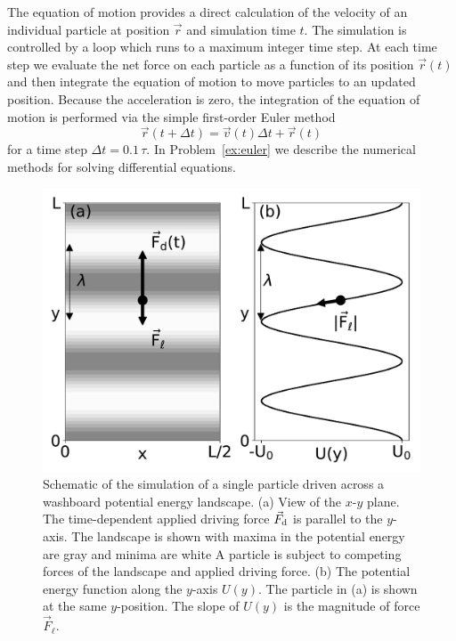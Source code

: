 \documentclass[preprint,showpacs,preprintnumbers,amsmath,amssymb,aps,prb]{revtex4-1}
\theoremstyle{remark}
\begin{document}
The equation of motion provides a direct calculation of the velocity
of an individual particle at position $\vec{r}$ 
and simulation time $t$.
The   simulation is controlled by a  loop
which runs to a maximum integer time step.
At each time step
we evaluate the net force on each particle as a function of its position
$\vec{r}(t)$
and then integrate
the equation of motion to move particles
to an updated position.
Because the acceleration is zero,
the integration of the equation of motion
is performed via 
the simple first-order Euler method 
\begin{equation}
  \vec{r}(t+\Delta t) = \vec{v}(t) \Delta t + \vec{r}(t)
    \label{eq:euler}
\end{equation}
for a time step $\Delta t = 0.1\,\tau$.
In 
Problem~\ref{ex:euler}
we describe 
the numerical methods for 
solving differential equations.
\begin{figure} %
\centering
\includegraphics[width=\columnwidth]{fig1_landscape.pdf}
\caption{
Schematic of the simulation of a single particle
  driven across a washboard potential energy landscape.
  (a) View of the $x$-$y$ plane. 
  The time-dependent applied driving force $\vec{F}_{\rm d}$
  is parallel to the $y$-axis.
  The landscape is shown with
  maxima in the potential energy are gray %
  and minima are white %
  A particle is 
  subject to competing forces of the landscape and applied driving force.
  (b) The potential energy function
  along the $y$-axis $U(y)$.  %
  The particle in (a) is shown at the same $y$-position.
  The slope of $U(y)$ %
  is the 
  magnitude of force $\vec{F}_{\ell}$. 
  }
\label{fig:1_landscape}
\end{figure}
%
\end{document}
